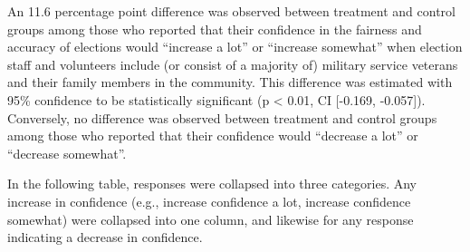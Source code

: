 \documentclass[
  11pt,
  a4paper,
]{article}
\begin{document}
\begin{figure}


\caption{\label{fig-q41-coef-plot}}

\end{figure}%

An 11.6 percentage point difference was observed between treatment and
control groups among those who reported that their confidence in the
fairness and accuracy of elections would ``increase a lot'' or
``increase somewhat'' when election staff and volunteers include (or
consist of a majority of) military service veterans and their family
members in the community. This difference was estimated with 95\%
confidence to be statistically significant (p \textless{} 0.01, CI
{[}-0.169, -0.057{]}). Conversely, no difference was observed between
treatment and control groups among those who reported that their
confidence would ``decrease a lot'' or ``decrease somewhat''.

In the following table, responses were collapsed into three categories.
Any increase in confidence (e.g., increase confidence a lot, increase
confidence somewhat) were collapsed into one column, and likewise for
any response indicating a decrease in confidence.
\end{document}
